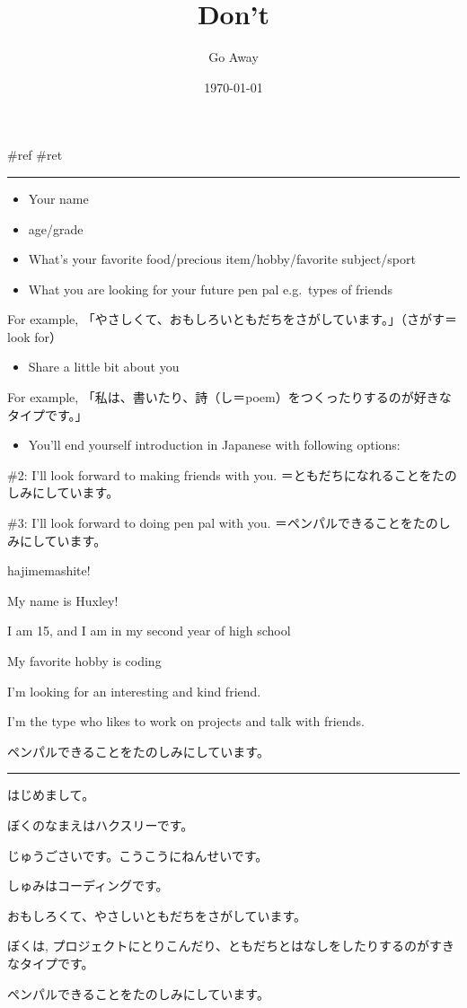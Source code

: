 \documentclass[letterpaper]{article}
\author{Go Away}
\date{\today}
\title{Don't}
\renewcommand{\tableofcontents}{}
\begin{document}
\tableofcontents

\#ref \#ret

\noindent\rule{\textwidth}{0.5pt}

\begin{itemize}
\item Your name

\item age/grade

\item What's your favorite food/precious item/hobby/favorite subject/sport

\item What you are looking for your future pen pal e.g. types of friends
\end{itemize}

For example,
「やさしくて、おもしろいともだちをさがしています。」（さがす＝look for）

\begin{itemize}
\item Share a little bit about you
\end{itemize}

For example,
「私は、書いたり、詩（し＝poem）をつくったりするのが好きなタイプです。」

\begin{itemize}
\item You'll end yourself introduction in Japanese with following options:
\end{itemize}

\#2: I'll look forward to making friends with you.
＝ともだちになれることをたのしみにしています。

\#3: I'll look forward to doing pen pal with you.
＝ペンパルできることをたのしみにしています。

hajimemashite!

My name is Huxley!

I am 15, and I am in my second year of high school

My favorite hobby is coding

I'm looking for an interesting and kind friend.

I'm the type who likes to work on projects and talk with friends.

ペンパルできることをたのしみにしています。

\noindent\rule{\textwidth}{0.5pt}

はじめまして。

ぼくのなまえはハクスリーです。

じゅうごさいです。こうこうにねんせいです。

しゅみはコーディングです。

おもしろくて、やさしいともだちをさがしています。

ぼくは,
プロジェクトにとりこんだり、ともだちとはなしをしたりするのがすきなタイプです。

ペンパルできることをたのしみにしています。
\end{document}
